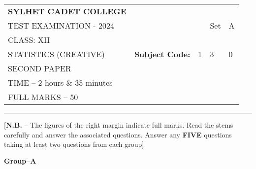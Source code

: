 \documentclass{article}
\begin{document}
\begin{table}[h]
\centering
\begin{tabular}{lllll}
\textbf{\large SYLHET CADET COLLEGE} &  &  &  &  \\ \cline{4-5} 
TEST EXAMINATION - 2024 &  & \multicolumn{1}{l|}{} & \multicolumn{1}{l|}{Set} & \multicolumn{1}{l|}{A} \\ \cline{4-5} 
CLASS: XII &  &  &  &  \\ \cline{3-5} 
STATISTICS (CREATIVE)& \multicolumn{1}{l|}{\textbf{Subject Code:}} & \multicolumn{1}{l|}{1} & \multicolumn{1}{l|}{3} & \multicolumn{1}{l|}{0} \\ \cline{3-5} 
 SECOND PAPER &  &  &  &  \\
TIME – 2 hours \& 35 minutes &  &  &  &  \\
FULL MARKS – 50 &  &  &  & 
\end{tabular}
\end{table}

\hrule

\begin{center}
[\textbf{N.B.} – The figures of the right margin indicate full marks. Read the stems carefully and answer the associated questions. Answer any \textbf{FIVE} questions taking at least two questions from each group]\\


\end{center}

  \begin{center}
  \textbf{Group--A}
  \end{center}
\end{document}
